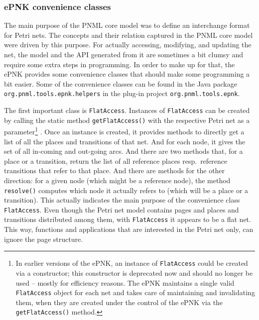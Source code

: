 \subsubsection{ePNK convenience classes}
\label{subsubsec:developer:functitions:utilities:convenience}

The main purpose of the PNML core model was to define an interchange format
for Petri nets. The concepts and their relation captured
in the PNML core model were driven by this purpose. For actually accessing,
modifying, and updating the net, the model and the API generated from it
are sometimes a bit clumsy and require some extra steps in programming.
In order to make up for that, the ePNK provides some convenience
classes that should make some programming a bit easier. Some of the
convenience classes can be found in the Java package
{\tt org.pnml.tools.epnk.helpers} in the plug-in project
{\tt org.pnml.tools.epnk}.

The first important class is {\tt FlatAccess}.
Instances of {\tt FlatAccess} can be created by calling the static method
{\tt getFlatAccess()}%
with the respective Petri net as a parameter\footnote
  {In earlier versions of the ePNK, an instance of {\tt FlatAccess} could be
   created via a constructor; this constructor is deprecated now and should
   no longer be used -- mostly for efficiency reasons. The ePNK maintains a single
   valid {\tt FlatAccess} object for each net and takes care of maintaining
   and invalidating them, when they are created under the control of the
   ePNK via the {\tt getFlatAccess()} method.}%
. Once an instance is
created, it provides methods to directly get a list of all the places and
transitions of that net. And for each node, it gives the set of all in-coming and out-going
arcs. And there are two methods that, for a place or a transition, return the
list of all reference places resp.\ reference transitions that refer to that place.
And there are methods for the other direction: for a given node
(which might be a reference node), the method {\tt resolve()}%
computes which node it actually refers to (which will be a place or a transition).
This actually indicates the main purpose of the convenience class
{\tt FlatAccess}. Even though the Petri net model contains pages and
places and transitions distributed among them, with {\tt FlatAccess}
it appears to be a flat net. This way, functions and applications that
are interested in the Petri net only, can ignore the page structure.

